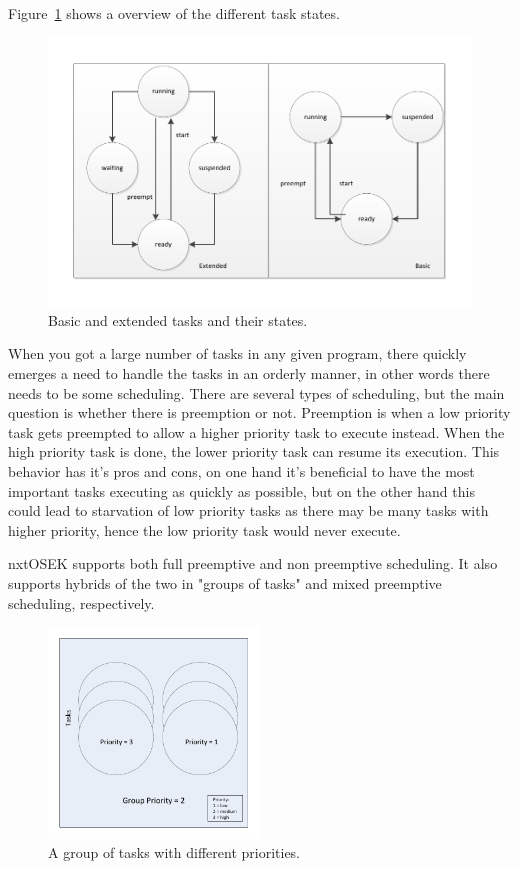 Figure~\ref{taskstate} shows a overview of the different task states.

\begin{figure}[hptb]
  \centering
    \includegraphics[width=1.0\textwidth]{img/taskstate.pdf}
  \caption{Basic and extended tasks and their states.}
  \label{taskstate}
\end{figure}

When you got a large number of tasks in any given program, there quickly emerges a need to handle the tasks in an orderly manner, in other words there needs to be some scheduling. There are several types of scheduling, but the main question is whether there is preemption or not. Preemption is when a low priority task gets preempted to allow a higher priority task to execute instead. When the high priority task is done, the lower priority task can resume its execution. This behavior has it's pros and cons, on one hand it's beneficial to have the most important tasks executing as quickly as possible, but on the other hand this could lead to starvation of low priority tasks as there may be many tasks with higher priority, hence the low priority task would never execute. 

nxtOSEK supports both full preemptive and non preemptive scheduling. It also supports hybrids of the two in "groups of tasks" and mixed preemptive scheduling, respectively.

\begin{figure}[hptb]
  \centering
    \includegraphics[width= 0.5\textwidth]{img/task_group.pdf}
  \caption{A group of tasks with different priorities.}
  \label{task_group}
\end{figure}

